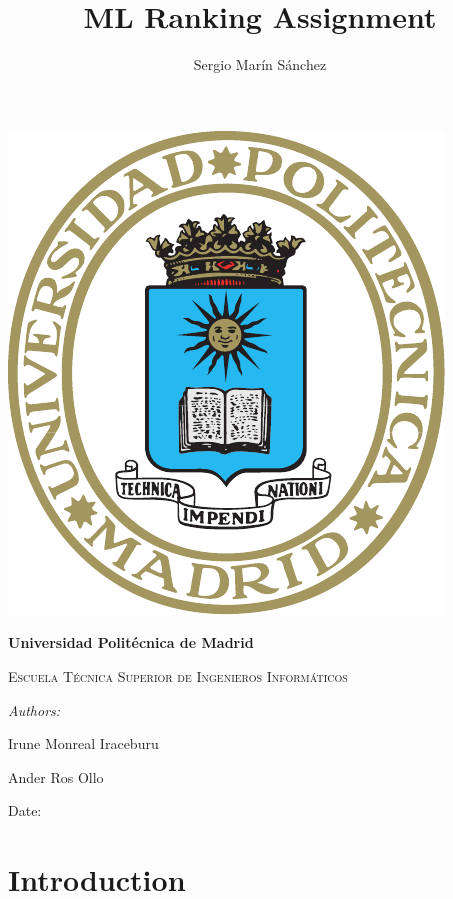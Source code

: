 \documentclass[12pt]{article}
\title{ ML Ranking Assignment %
}
\author{ Sergio Marín Sánchez %
}
\begin{document}
\begin{titlepage}
    \centering
    \phantom{a}
    \vspace{1cm}
    {\includegraphics{ESCUDO_UPM.pdf}\par}
    \vspace{1cm}
    {\bfseries\LARGE Universidad Politécnica de Madrid \par}
    \vspace{1cm}
    {\scshape\Large Escuela Técnica Superior de Ingenieros Informáticos \par}
    \vspace{1cm}
    {\scshape\Huge \thetitle \par}
    \vfill
    {\itshape\large Authors: %
     \par}
    {\large \theauthor \par}
    {\large Irune Monreal Iraceburu \par}
    {\large Ander Ros Ollo \par}
    \vspace{0.2cm}
    {\large Date:  \par}
\end{titlepage}

\section{Introduction}
\end{document}
